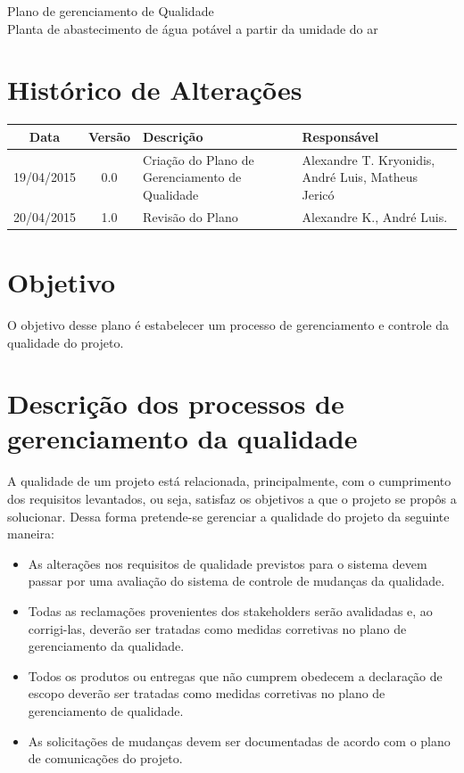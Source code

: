 \documentclass[12pt,openright,oneside,a4paper,brazil]{abntex2}
\title{}
\author{}
\begin{document}
\textual
\begin{center}
 {\large Plano de gerenciamento de Qualidade}\\[0.2cm]
 {Planta de abastecimento de água potável a partir da umidade do ar}\\
 \end{center}
 
 \section{Histórico de Alterações}
\begin{table}[h]
\centering
\begin{tabular}{|c|c|p{6cm}|p{5cm}|}

Data & Versão & Descrição & Responsável\\
\hline                               
19/04/2015 & 0.0 & Criação do Plano de Gerenciamento de Qualidade & Alexandre T. Kryonidis, André Luis, Matheus Jericó\\
\hline
20/04/2015 & 1.0 & Revisão do Plano & Alexandre K., André Luis.\\
\hline
\end{tabular}
\end{table}

\section{Objetivo}
  O objetivo desse plano é estabelecer um processo de gerenciamento e controle da qualidade do projeto.
  
\section{Descrição dos processos de gerenciamento da qualidade}
 A qualidade de um projeto está relacionada, principalmente, com o cumprimento dos requisitos levantados, ou seja, satisfaz os objetivos a que o projeto se propôs a solucionar. Dessa forma pretende-se gerenciar a qualidade do projeto da seguinte maneira:
 \begin{itemize}

\item As alterações nos requisitos de qualidade previstos para o sistema devem passar por uma avaliação do sistema de controle de mudanças da qualidade.
\item Todas as reclamações provenientes dos stakeholders serão avalidadas e, ao corrigi-las, deverão ser tratadas como medidas corretivas no plano de gerenciamento da qualidade.
\item Todos os produtos ou entregas que não cumprem obedecem a declaração de escopo deverão ser tratadas como medidas corretivas no plano de gerenciamento de qualidade.
\item As solicitações de mudanças devem ser documentadas de acordo com o plano de comunicações do projeto.	
 \end{itemize}
 
\end{document}
